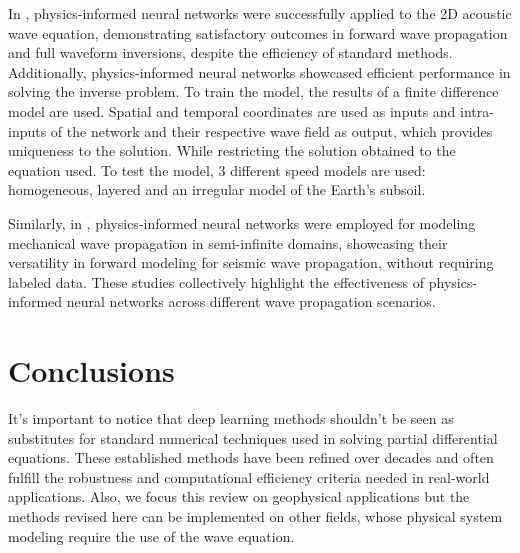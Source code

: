 \documentclass[11pt,twoside]{article}
\begin{document}
In , physics-informed neural networks were successfully applied to the 2D acoustic wave 
equation, demonstrating satisfactory outcomes in forward wave propagation and full waveform inversions, despite the efficiency of standard 
methods. Additionally, physics-informed neural networks showcased efficient performance in solving the inverse problem. To train the model, 
the results of a finite difference model are used. Spatial and temporal coordinates are used as inputs and intra-inputs of the network and 
their respective wave field as output, which provides uniqueness to the solution. While restricting the solution obtained to the equation 
used. To test the model, 3 different speed models are used: homogeneous, layered and an irregular model of the Earth's subsoil.

Similarly, in , physics-informed neural networks were employed for modeling mechanical wave propagation 
in semi-infinite domains, showcasing their versatility in forward modeling for seismic wave propagation, without requiring labeled data. 
These studies collectively highlight the effectiveness of physics-informed neural networks across different wave propagation scenarios.

\section{Conclusions}\label{sec:conclusions}


It's important to notice that deep learning methods shouldn't be seen as substitutes for standard numerical techniques used in solving 
partial differential equations. These established methods have been refined over decades and often fulfill the robustness and computational 
efficiency criteria needed in real-world applications. Also, we focus this review on geophysical applications but the methods revised here 
can be implemented on other fields, whose physical system modeling require the use of the wave equation. 


\end{document}
